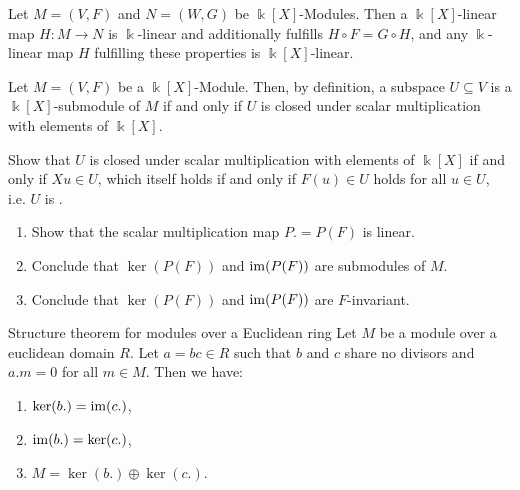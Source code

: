 \begin{exercise}
	Let $M = (V,F)$ and $N = (W,G)$ be $\Bbbk[X]$-Modules. Then a $\Bbbk[X]$-linear map $H : M \to N$ is $\Bbbk$-linear and additionally fulfills $H \circ F = G \circ H$, and any $\Bbbk$-linear map $H$ fulfilling these properties is $\Bbbk[X]$-linear.
\end{exercise}
Let $M = (V,F)$ be a $\Bbbk[X]$-Module. Then, by definition, a subspace $U \subseteq V$ is a $\Bbbk[X]$-submodule of $M$ if and only if $U$ is closed under scalar multiplication with elements of $\Bbbk[X]$.
\begin{exercise}
	Show that $U$ is closed under scalar multiplication with elements of $\Bbbk[X]$ if and only if $Xu \in U$, which itself holds if and only if $F(u) \in U$ holds for all $u \in U$, i.e. $U$ is .
\end{exercise}
\begin{exercise}
	\begin{enumerate}
		\item Show that the scalar multiplication map $P. = P(F)$ is linear.
		\item Conclude that $\ker(P(F))$ and $\operatorname{im}(P(F))$ are submodules of $M$.
		\item Conclude that $\ker(P(F))$ and $\operatorname{im}(P(F))$ are $F$-invariant. 
	\end{enumerate}
\end{exercise}
\begin{importanttheorem}{Structure theorem for modules over a Euclidean ring}{}
	Let $M$ be a module over a euclidean domain $R$. Let $a = bc \in R$ such that $b$ and $c$ share no divisors and $a.m = 0$ for all $m \in M$. Then we have:
	\begin{enumerate}
		\item $\ker(b.) = \operatorname{im}(c.)$,
		\item $\operatorname{im}(b.) = \ker(c.)$,
		\item $M = \ker(b.) \oplus \ker(c.)$.
	\end{enumerate}
\end{importanttheorem}
